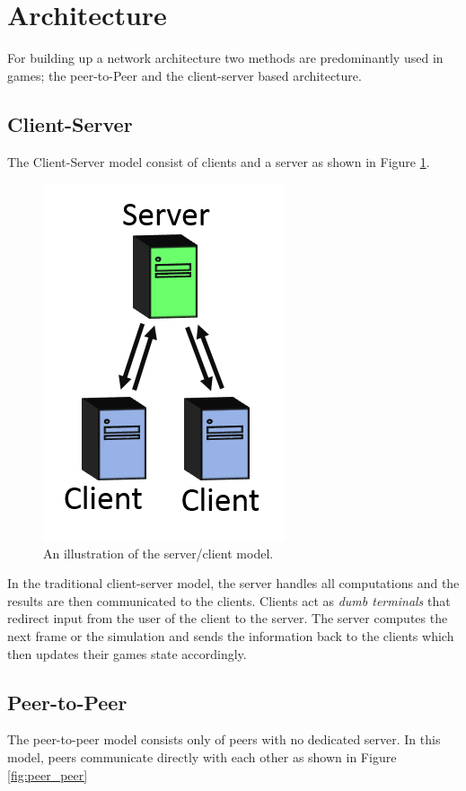 \section{Architecture}
For building up a network architecture two methods are predominantly used in games; the peer-to-Peer and the client-server based architecture.


\subsection{Client-Server}
The Client-Server model consist of clients and a server as shown in Figure \ref{fig:server_client}. 

\begin{figure}[H]
\centering
\includegraphics[scale=1]{figures/network/server_client}
\caption{An illustration of the server/client model.}
\label{fig:server_client}
\end{figure}

In the traditional client-server model, the server handles all computations and the results are then communicated to the clients.
Clients act as \textit{dumb terminals} that redirect input from the user of the client to the server.
The server computes the next frame or the simulation and sends the information back to the clients which then updates their games state accordingly.


\subsection{Peer-to-Peer}
The peer-to-peer model consists only of peers with no dedicated server.
In this model, peers communicate directly with each other as shown in Figure \ref{fig:peer_peer}

